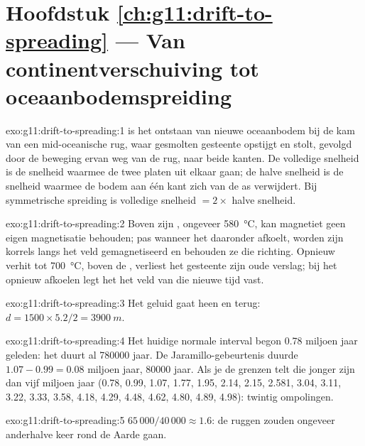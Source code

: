\section*{Hoofdstuk \ref{ch:g11:drift-to-spreading} --- Van continentverschuiving tot oceaanbodemspreiding}

\begin{solution}{exo:g11:drift-to-spreading:1}
 is het ontstaan van nieuwe oceaanbodem bij de kam van een
mid-oceanische rug, waar gesmolten gesteente opstijgt en stolt, gevolgd door de
beweging ervan weg van de rug, naar beide kanten. De volledige snelheid is de
snelheid waarmee de twee platen uit elkaar gaan; de halve snelheid is de snelheid
waarmee de bodem aan één kant zich van de as verwijdert. Bij symmetrische
spreiding is volledige snelheid $= 2
\times$ halve snelheid.
\end{solution}

\begin{solution}{exo:g11:drift-to-spreading:2}
Boven zijn , ongeveer \qty{580}{\celsius}, kan magnetiet geen
eigen magnetisatie behouden; pas wanneer het daaronder afkoelt, worden zijn
korrels langs het veld gemagnetiseerd en behouden ze die richting. Opnieuw verhit
tot \qty{700}{\celsius}, boven de , verliest het gesteente zijn
oude verslag; bij het opnieuw afkoelen legt het het veld van die nieuwe tijd vast.
\end{solution}

\begin{solution}{exo:g11:drift-to-spreading:3}
Het geluid gaat heen en terug: $d = 1500 \times 5.2/2 = \qty{3900}{m}$.
\end{solution}

\begin{solution}{exo:g11:drift-to-spreading:4}
Het huidige normale interval begon \num{0.78} miljoen jaar geleden: het duurt al
\num{780000} jaar. De Jaramillo-gebeurtenis duurde $1.07 - 0.99 = \num{0.08}$
miljoen jaar, \num{80000} jaar. Als je de grenzen telt die jonger zijn dan vijf
miljoen jaar (0.78, 0.99, 1.07, 1.77, 1.95, 2.14, 2.15, 2.581, 3.04, 3.11,
3.22, 3.33, 3.58, 4.18, 4.29, 4.48, 4.62, 4.80, 4.89, 4.98): twintig ompolingen.
\end{solution}

\begin{solution}{exo:g11:drift-to-spreading:5}
$65\,000/40\,000 \approx 1.6$: de ruggen zouden ongeveer anderhalve keer rond de
Aarde gaan.
\end{solution}

